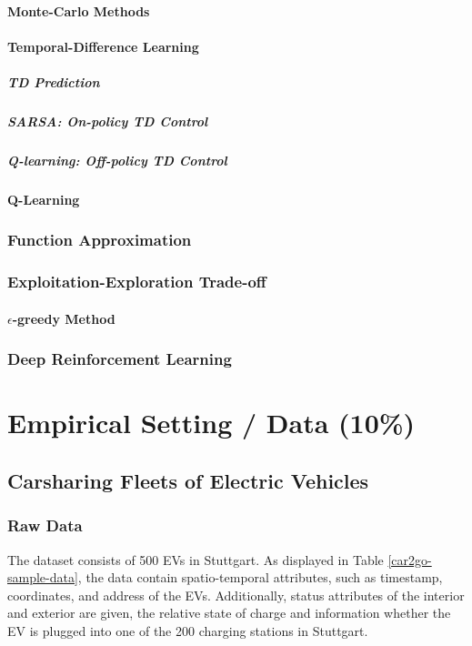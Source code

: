 \documentclass[12pt, article]{article}
\begin{document}
\paragraph{Monte-Carlo Methods}
\label{sec:org754775a}
\paragraph{Temporal-Difference Learning}
\label{sec:org8541c49}
\subparagraph{TD Prediction}
\label{sec:orge323d50}
\subparagraph{SARSA: On-policy TD Control}
\label{sec:org9fc07f4}
\subparagraph{Q-learning: Off-policy TD Control}
\label{sec:org45a2ee8}
\paragraph{Q-Learning}
\label{sec:org3a6eed4}
\subsubsection{Function Approximation}
\label{sec:org9b1c2de}
\subsubsection{Exploitation-Exploration Trade-off}
\label{sec:org2cf39a7}
\paragraph{\(\epsilon\)-greedy Method}
\label{sec:org2611581}
\subsubsection{Deep Reinforcement Learning}
\label{sec:org2ac31a7}
\section{Empirical Setting / Data (10\%)}
\label{sec:org56bfdd9}
\subsection{Carsharing Fleets of Electric Vehicles}
\label{sec:org55eba46}
\subsubsection{Raw Data}
\label{sec:org4930131}
The dataset consists of 500 EVs in Stuttgart. As displayed in Table
\ref{car2go-sample-data}, the data contain spatio-temporal attributes, such as
timestamp, coordinates, and address of the EVs. Additionally, status attributes
of the interior and exterior are given, the relative state of charge and
information whether the EV is plugged into one of the 200 charging stations in
Stuttgart.
\end{document}
